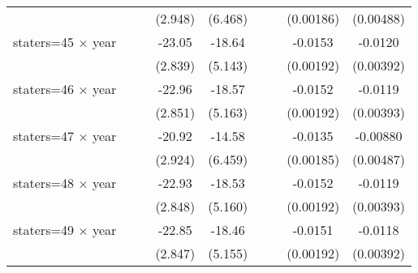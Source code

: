 {\begin{longtable}{l*{8}{c}}
                    &                     &                     &     (2.948)         &     (6.468)         &                     &                     &   (0.00186)         &   (0.00488)         \\
[1em]
staters=45 $\times$ year&                     &                     &      -23.05\sym{***}&      -18.64\sym{***}&                     &                     &     -0.0153\sym{***}&     -0.0120\sym{***}\\
                    &                     &                     &     (2.839)         &     (5.143)         &                     &                     &   (0.00192)         &   (0.00392)         \\
[1em]
staters=46 $\times$ year&                     &                     &      -22.96\sym{***}&      -18.57\sym{***}&                     &                     &     -0.0152\sym{***}&     -0.0119\sym{***}\\
                    &                     &                     &     (2.851)         &     (5.163)         &                     &                     &   (0.00192)         &   (0.00393)         \\
[1em]
staters=47 $\times$ year&                     &                     &      -20.92\sym{***}&      -14.58\sym{**} &                     &                     &     -0.0135\sym{***}&    -0.00880\sym{*}  \\
                    &                     &                     &     (2.924)         &     (6.459)         &                     &                     &   (0.00185)         &   (0.00487)         \\
[1em]
staters=48 $\times$ year&                     &                     &      -22.93\sym{***}&      -18.53\sym{***}&                     &                     &     -0.0152\sym{***}&     -0.0119\sym{***}\\
                    &                     &                     &     (2.848)         &     (5.160)         &                     &                     &   (0.00192)         &   (0.00393)         \\
[1em]
staters=49 $\times$ year&                     &                     &      -22.85\sym{***}&      -18.46\sym{***}&                     &                     &     -0.0151\sym{***}&     -0.0118\sym{***}\\
                    &                     &                     &     (2.847)         &     (5.155)         &                     &                     &   (0.00192)         &   (0.00392)         \\

\end{longtable}}
